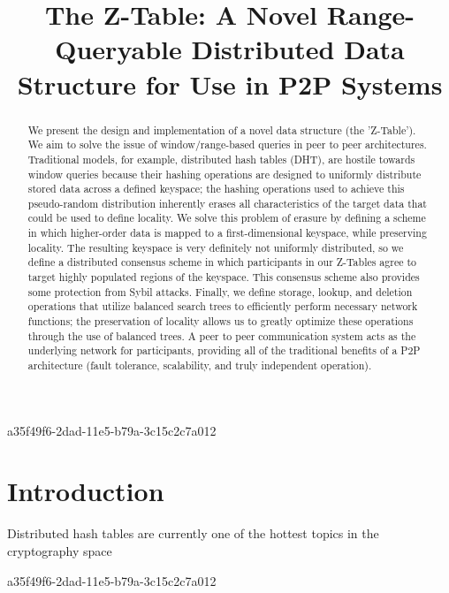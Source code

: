 \documentclass[12pt]{article}
\title{The Z-Table: A Novel Range-Queryable Distributed Data Structure for Use in P2P Systems}
\begin{document}
\maketitle

\begin{abstract}
We present the design and implementation of a novel data structure (the 'Z-Table'). We aim to solve the issue of window/range-based queries in peer to peer architectures. Traditional models, for example,  distributed hash tables (DHT), are hostile towards window queries because their hashing operations are designed to uniformly distribute stored data across a defined keyspace; the hashing operations used to achieve this pseudo-random distribution inherently erases all characteristics of the target data that could be used to define locality. We solve this problem of erasure by defining a scheme in which higher-order data is mapped to a first-dimensional keyspace, while preserving locality. The resulting keyspace is very definitely not uniformly distributed, so we define a distributed consensus scheme in which participants in our Z-Tables agree to target highly populated regions of the keyspace. This consensus scheme also provides some protection from Sybil attacks. Finally, we define storage, lookup, and deletion operations that utilize balanced search trees to efficiently perform necessary network functions; the preservation of locality allows us to greatly optimize these operations through the use of balanced trees. A peer to peer communication system acts as the underlying network for participants, providing all of the traditional benefits of a P2P architecture (fault tolerance, scalability, and truly independent operation).
\end{abstract}
a35f49f6-2dad-11e5-b79a-3c15c2c7a012

\newpage
\section{Introduction}
Distributed hash tables are currently one of the hottest topics in the cryptography space~\cite{Stoica:2001dj,Rowstron:2001ea,Ratnasamy:2001wn}

\printbibliography
a35f49f6-2dad-11e5-b79a-3c15c2c7a012
\end{document}

